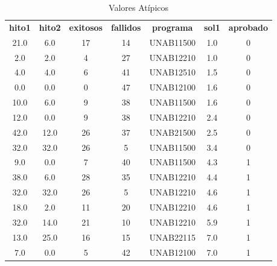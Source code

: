 \begin{table}[H]
    \centering
    \caption{Valores Atípicos}
    \begin{tabular}{ccccccc}
        \hline
        \textbf{hito1} & \textbf{hito2} & \textbf{exitosos} & \textbf{fallidos} & \textbf{programa} & \textbf{sol1} & \textbf{aprobado} \\
        21.0           & 6.0            & 17                & 14                & UNAB11500         & 1.0           & 0                 \\
        2.0            & 2.0            & 4                 & 27                & UNAB12210         & 1.0           & 0                 \\
        4.0            & 4.0            & 6                 & 41                & UNAB12510         & 1.5           & 0                 \\
        0.0            & 0.0            & 0                 & 47                & UNAB12100         & 1.6           & 0                 \\
        10.0           & 6.0            & 9                 & 38                & UNAB11500         & 1.6           & 0                 \\
        12.0           & 0.0            & 9                 & 38                & UNAB12210         & 2.4           & 0                 \\
        42.0           & 12.0           & 26                & 37                & UNAB21500         & 2.5           & 0                 \\
        32.0           & 32.0           & 26                & 5                 & UNAB11500         & 3.4           & 0                 \\
        9.0            & 0.0            & 7                 & 40                & UNAB11500         & 4.3           & 1                 \\
        38.0           & 6.0            & 28                & 35                & UNAB12210         & 4.4           & 1                 \\
        32.0           & 32.0           & 26                & 5                 & UNAB12210         & 4.6           & 1                 \\
        18.0           & 2.0            & 11                & 20                & UNAB12210         & 4.6           & 1                 \\
        32.0           & 14.0           & 21                & 10                & UNAB12210         & 5.9           & 1                 \\
        13.0           & 25.0           & 16                & 15                & UNAB22115         & 7.0           & 1                 \\
        7.0            & 0.0            & 5                 & 42                & UNAB12100         & 7.0           & 1                 \\
        \hline
    \end{tabular}%
    \label{tab:valores_atipicos}%
\end{table}%

